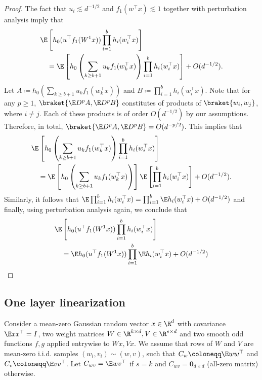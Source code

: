 \begin{proof}
    The fact that \(u_i \lesssim d^{-1/2}\) and \(f_1(w^{\top} x) \lesssim 1\) together with perturbation analysis imply that
    \begin{equation}
        \begin{aligned}
        &\E \left[ h_0(u^{\top} f_1(W^1 x)) \prod_{i=1}^b h_i(w_{i}^{\top} x)\right] \\
        &\quad = 
        \E \left[ h_0\left(\sum_{k\geq b + 1} u_k f_1(w_k^\top x)\right) \prod_{i=1}^b h_i(w_{i}^{\top} x)\right] + O(d^{-1/2}).
        \end{aligned}
    \end{equation}
    Let \(A \coloneqq h_0\left(\sum_{k\geq b + 1} u_k f_1(w_k^\top x)\right)\) and \(B \coloneqq \prod_{i=1}^b h_i(w_{i}^{\top} x)\). Note that for any \(p \geq 1\), \(\braket{\E D^p A, \E D^p B}\) constitutes of products of \(\braket{w_i, w_j}\), where \(i \neq j\). Each of these products is of order \(O(d^{-1/2})\) by our assumptions. Therefore, in total, \(\braket{\E D^p A, \E D^p B} = O(d^{-p/2})\). This implies that 
    \begin{equation}
        \begin{aligned}
        &\E \left[ h_0\left(\sum_{k\geq b + 1} u_k f_1(w_k^\top x)\right) \prod_{i=1}^b h_i(w_{i}^{\top} x)\right]\\
        &\quad = \E \left[ h_0\left(\sum_{k\geq b + 1} u_k f_1(w_k^\top x)\right)\right] \E \left[ \prod_{i=1}^b h_i(w_{i}^{\top} x)\right] + O(d^{-1/2}).
        \end{aligned}
    \end{equation}
    Similarly, it follows that \(\E \prod_{i=1}^b h_i(w_{i}^{\top} x) = \prod_{i=1}^b \E h_i(w_{i}^{\top} x) + O(d^{-1/2})\) and finally, using perturbation analysis again, we conclude that
    \begin{equation}
        \begin{aligned}
        &\E \left[ h_0(u^{\top} f_1(W^1 x)) \prod_{i=1}^b h_i(w_{i}^{\top} x)\right] \\
        &\quad =\E h_0(u^{\top} f_1(W^1 x)) \prod_{i=1}^b \E h_i(w_{i}^{\top} x) + O(d^{-1/2})
        \end{aligned}
    \end{equation}
\end{proof}

\subsection{One layer linearization}
Consider a mean-zero Gaussian random vector $x \in \R^d$ with covariance $\E x x^\top =I$, two weight matrices $W\in \R^{k\times d}, V\in\R^{s\times d}$ and two smooth odd functions $f,g$ applied entrywise to $Wx,Vx$. 
We assume that rows of \(W\) and \(V\) are mean-zero i.i.d. samples \((w_i, v_i) \sim (w, v)\), such that \(C_w \coloneqq \E ww^{\top}\) and \(C_v \coloneqq \E vv^{\top}\). Let \(C_{wv} = \E w v^{\top}\) if \(s = k\) and \(C_{wv} = \mathbf{0}_{d \times d}\) (all-zero matrix) otherwise.

